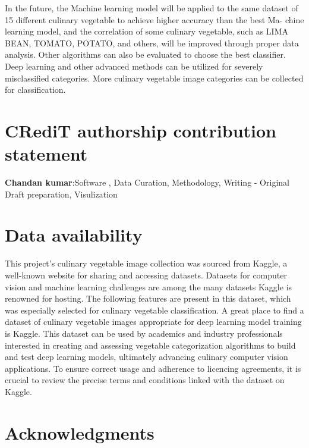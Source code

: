 \documentclass[a4paper,fleqn]{cas-sc}
\begin{document}
In the future, the Machine learning model will be applied to the same dataset of 15 different culinary vegetable to achieve higher accuracy than the best Ma- chine learning model, and the correlation of some culinary vegetable, such as LIMA BEAN, TOMATO, POTATO, and others, will be improved through proper data analysis. Other algorithms can also be evaluated to choose the best classifier. Deep learning and other advanced methods can be utilized for severely misclassified categories. More culinary vegetable image categories can be collected for classification.






\section*{CRediT authorship contribution statement}
\textbf{Chandan kumar}:Software , Data Curation, Methodology, Writing - Original Draft preparation, Visulization
 
\section*{Data availability}
This project's culinary vegetable image collection was sourced from Kaggle, a well-known website for sharing and accessing datasets. Datasets for computer vision and machine learning challenges are among the many datasets Kaggle is renowned for hosting. The following features are present in this dataset, which was especially selected for culinary vegetable classification.
A great place to find a dataset of culinary vegetable images appropriate for deep learning model training is Kaggle. This dataset can be used by academics and industry professionals interested in creating and assessing vegetable categorization algorithms to build and test deep learning models, ultimately advancing culinary computer vision applications. To ensure correct usage and adherence to licencing agreements, it is crucial to review the precise terms and conditions linked with the dataset on Kaggle.
\section*{Acknowledgments}
\label{}






\label{}

\printcredits

%




\bio{}
\endbio

\endbio
\end{document}
